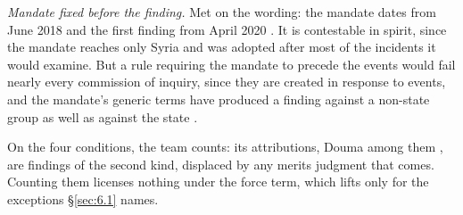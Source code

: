 \emph{Mandate fixed before the finding.} Met on the wording: the mandate dates from June 2018 and the first finding from April 2020 \autocite{opcw2020iitltamenah}. It is contestable in spirit, since the mandate reaches only Syria and was adopted after most of the incidents it would examine. But a rule requiring the mandate to precede the events would fail nearly every commission of inquiry, since they are created in response to events, and the mandate's generic terms have produced a finding against a non-state group as well as against the state \autocite{opcw2024iitmarea}.

On the four conditions, the team counts: its attributions, Douma among them \autocite{opcw2023iitdouma}, are findings of the second kind, displaced by any merits judgment that comes. Counting them licenses nothing under the force term, which lifts only for the exceptions \S\ref{sec:6.1} names.
